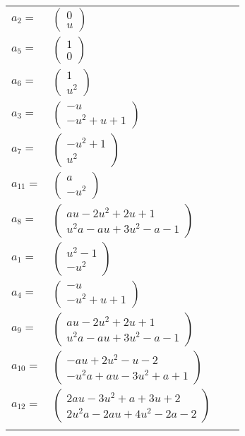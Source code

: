 \documentclass[1p]{elsarticle_modified}
\theoremstyle{definition}
\begin{document}
\begin{tabular}{m{7pt} m{180pt} m{7pt} m{180pt} }
\flushright $a_{2}=$&$\begin{pmatrix}0\\u\end{pmatrix}$ \\
\flushright $a_{5}=$&$\begin{pmatrix}1\\0\end{pmatrix}$ \\
\flushright $a_{6}=$&$\begin{pmatrix}1\\u^2\end{pmatrix}$ \\
\flushright $a_{3}=$&$\begin{pmatrix}- u\\- u^2+u+1\end{pmatrix}$ \\
\flushright $a_{7}=$&$\begin{pmatrix}- u^2+1\\u^2\end{pmatrix}$ \\
\flushright $a_{11}=$&$\begin{pmatrix}a\\- u^2\end{pmatrix}$ \\
\flushright $a_{8}=$&$\begin{pmatrix}a u-2 u^2+2 u+1\\u^2 a- a u+3 u^2- a-1\end{pmatrix}$ \\
\flushright $a_{1}=$&$\begin{pmatrix}u^2-1\\- u^2\end{pmatrix}$ \\
\flushright $a_{4}=$&$\begin{pmatrix}- u\\- u^2+u+1\end{pmatrix}$ \\
\flushright $a_{9}=$&$\begin{pmatrix}a u-2 u^2+2 u+1\\u^2 a- a u+3 u^2- a-1\end{pmatrix}$ \\
\flushright $a_{10}=$&$\begin{pmatrix}- a u+2 u^2- u-2\\- u^2 a+a u-3 u^2+a+1\end{pmatrix}$ \\
\flushright $a_{12}=$&$\begin{pmatrix}2 a u-3 u^2+a+3 u+2\\2 u^2 a-2 a u+4 u^2-2 a-2\end{pmatrix}$\\&\end{tabular}
\end{document}
